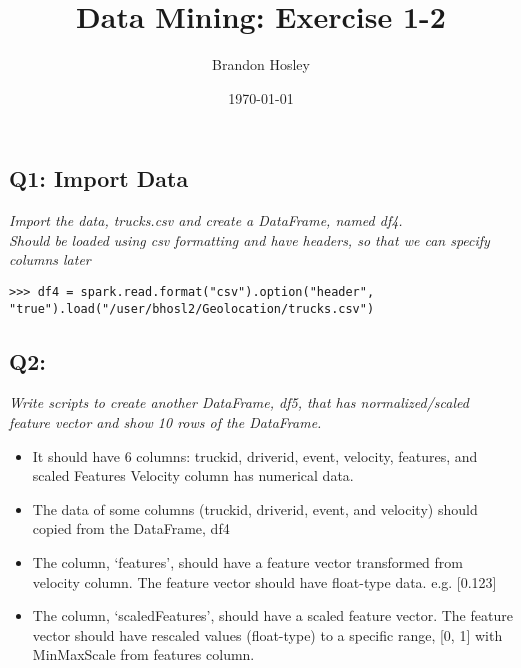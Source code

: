 \documentclass[]{article}
\title{Data Mining: Exercise 1-2}
\author{Brandon Hosley}
\date{\today}
\begin{document}
\maketitle

\subsection*{Q1: Import Data}
\emph{Import the data, trucks.csv and create a DataFrame, named df4. \\
	Should be loaded using csv formatting and have headers, so that we can specify columns later}
\begin{verbatim}
>>> df4 = spark.read.format("csv").option("header", "true").load("/user/bhosl2/Geolocation/trucks.csv")
\end{verbatim}

\subsection*{Q2: }
\emph{Write scripts to create another DataFrame, df5, 
	that has normalized/scaled feature vector and
	show 10 rows of the DataFrame.}
	\begin{itemize}[before=\itshape,font=\normalfont]
		\item It should have 6 columns: truckid, driverid, event, velocity, features, and scaled Features Velocity column has numerical data.
		\item The data of some columns (truckid, driverid, event, and velocity) should copied from the DataFrame, df4
		\item The column, ‘features’, should have a feature vector transformed from velocity column. The feature vector should have float-type data. e.g. [0.123]
		\item The column, ‘scaledFeatures’, should have a scaled feature vector. The feature vector should have rescaled values (float-type) to a specific range, [0, 1] with MinMaxScale from features column.
	\end{itemize} 
\end{document}
